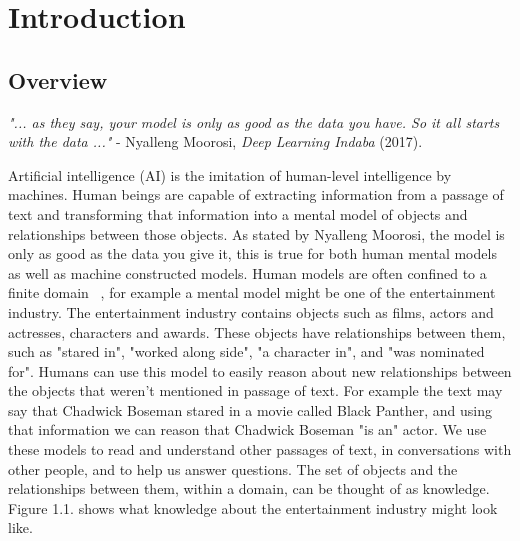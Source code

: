 
\chapter{Introduction}  %

\ifpdf
     \graphicspath{{/Users/luyolomagangane/Documents/Academics/Figures/Chapter1/}}
\else
    \graphicspath{{Chapter1/Figs/Vector/}{Chapter1/Figs/}}
\fi



\section{Overview} %

\emph{"... as they say, your model is only as good as the data you have. \newline So it all starts with the data ..."} \newline
\indent \indent - Nyalleng Moorosi, \emph{Deep Learning Indaba} (2017). \newline 

Artificial intelligence (AI) is the imitation of human-level intelligence by machines. Human beings are capable of extracting information from a passage of text and transforming that information into a mental model of objects and relationships between those objects. As stated by Nyalleng Moorosi, the model is only as good as the data you give it, this is true for both human mental models as well as machine constructed models. \newline 
Human models are often confined to a finite domain ~\citep{staab2010handbook}, for example a mental model might be one of the entertainment industry. The entertainment industry contains objects such as films, actors and actresses, characters and awards. These objects have relationships between them, such as "stared in", "worked along side", "a character in", and "was nominated for". Humans can use this model to easily reason about new relationships between the objects that weren't mentioned in passage of text. For example the text may say that Chadwick Boseman stared in a movie called Black Panther, and using that information we can reason that Chadwick Boseman "is an" actor. \newline
We use these models to read and understand other passages of text, in conversations with other people, and to help us answer questions. The set of objects and the relationships between them, within a domain, can be thought of as knowledge. Figure 1.1. shows what knowledge about the entertainment industry might look like. \newline

